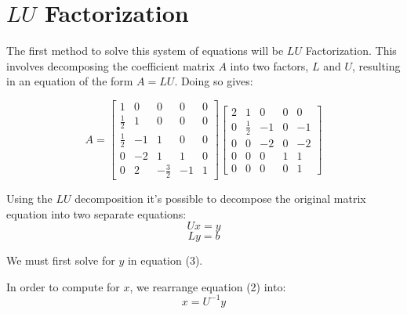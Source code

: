\documentclass[paper.tex]{subfiles}
\begin{document}
\section{$LU$ Factorization}

The first method to solve this system of equations will be $LU$ Factorization.
This involves decomposing the coefficient matrix $A$ into two factors, $L$ and $U$, resulting in an equation of the form $A = LU$.
Doing so gives:
\begin{center}
\begin{equation*}
    A = \begin{bmatrix}
        1 & 0 & 0 & 0 & 0 \\
        \frac{1}{2} & 1 & 0 & 0 & 0 \\
        \frac{1}{2} & -1 & 1 & 0 & 0 \\
        0 & -2 & 1 & 1 & 0 \\
        0 & 2 & -\frac{3}{2} & -1 & 1
    \end{bmatrix}
    \begin{bmatrix}
        2 & 1 & 0 & 0 & 0 \\
        0 & \frac{1}{2} & -1 & 0 & -1 \\
        0 & 0 & -2 & 0 & -2 \\
        0 & 0 & 0 & 1 & 1 \\
        0 & 0 & 0 & 0 & 1 
    \end{bmatrix}
\end{equation*}
\end{center}

Using the $LU$ decomposition it's possible to decompose the original matrix equation into two separate equations:
\begin{equation}
    Ux = y
\end{equation}
\begin{equation}
    Ly = b
\end{equation}

We must first solve for $y$ in equation (3). 
\begin{equation}
    
\end{equation}

In order to compute for $x$, we rearrange equation (2) into:
\begin{equation}
x = U^{-1}y
\end{equation}
\end{document}
